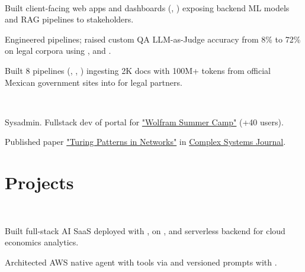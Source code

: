 \documentclass{tex/deedy-resume-openfont}
\begin{document}
\begin{minipage}[t]{0.67\textwidth}
\\
\begin{tightemize}
    \item Built client-facing web apps and dashboards (, ) exposing backend ML models and RAG pipelines to stakeholders.
    \item Engineered  pipelines; raised custom QA LLM-as-Judge accuracy from 8\% to 72\% on legal corpora using ,  and .
    \item Built 8  pipelines (, , ) ingesting 2K docs with 100M+ tokens from official Mexican government sites into  for legal partners.
\end{tightemize}
\sectionsep

\\
\begin{tightemize}
    \item Sysadmin. Fullstack dev of portal for \href{https://www.notebookarchive.org/collection-pod?collection=wolfram-summer-school-2021}{"Wolfram Summer Camp"} (+40 users).
    \item Published paper \href{https://www.complex-systems.com/abstracts/v32_i03_a02/}{"Turing Patterns in Networks"} in \href{https://www.complex-systems.com/}{Complex Systems Journal}.
\end{tightemize}


\section{Projects}

\\
\begin{tightemize}
    \item Built full-stack AI SaaS deployed with ,  on , and serverless  backend for cloud economics analytics.
    \item Architected AWS native agent with tools via  and versioned prompts with .
\end{tightemize}
\sectionsep


\end{minipage}
\end{document}
